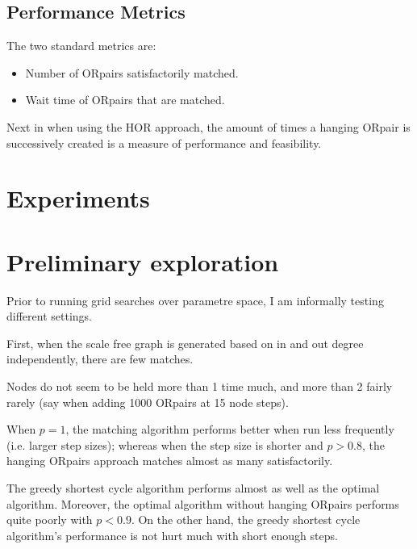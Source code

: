 \documentclass[main.tex]{subfiles}
\begin{document}
\subsection{Performance Metrics}
The two standard metrics are:
\begin{itemize}
  \item Number of ORpairs satisfactorily matched.
  \item Wait time of ORpairs that are matched.
\end{itemize}

Next in when using the HOR approach, the amount of times a hanging ORpair is successively created is a measure of performance and feasibility.

\section{Experiments}



\section{Preliminary exploration}
Prior to running grid searches over parametre space, I am informally testing different settings.

First, when the scale free graph is generated based on in and out degree independently, there are few matches.

Nodes do not seem to be held more than 1 time much, and more than 2 fairly rarely (say when adding 1000 ORpairs at 15 node steps).

When $p=1$, the matching algorithm performs better when run less frequently (i.e. larger step sizes); whereas when the step size is shorter and $p > 0.8$, the hanging ORpairs approach matches almost as many satisfactorily.

The greedy shortest cycle algorithm performs almost as well as the optimal algorithm. Moreover, the optimal algorithm without hanging ORpairs performs quite poorly with $p < 0.9$. On the other hand, the greedy shortest cycle algorithm's performance is not hurt much with short enough steps.
\end{document}
